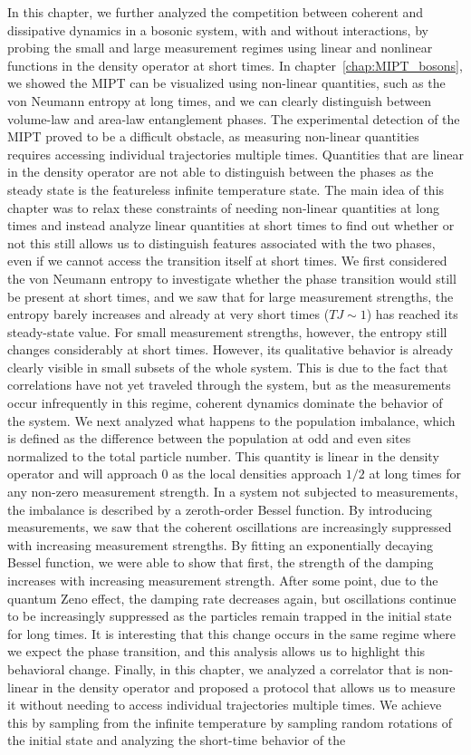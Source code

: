 In this chapter, we further analyzed the competition between coherent and dissipative dynamics in a bosonic system, with and without interactions, by probing the small and large measurement regimes using linear and nonlinear functions in the density operator at short times. In chapter~\ref{chap:MIPT_bosons}, we showed the MIPT can be visualized using non-linear quantities, such as the von Neumann entropy at long times, and we can clearly distinguish between volume-law and area-law entanglement phases. The experimental detection of the MIPT proved to be a difficult obstacle, as measuring non-linear quantities requires accessing individual trajectories multiple times. Quantities that are linear in the density operator are not able to distinguish between the phases as the steady state is the featureless infinite temperature state. The main idea of this chapter was to relax these constraints of needing non-linear quantities at long times and instead analyze linear quantities at short times to find out whether or not this still allows us to distinguish features associated with the two phases, even if we cannot access the transition itself at short times. We first considered the von Neumann entropy to investigate whether the phase transition would still be present at short times, and we saw that for large measurement strengths, the entropy barely increases and already at very short times ($TJ \sim 1$) has reached its steady-state value. For small measurement strengths, however, the entropy still changes considerably at short times. However, its qualitative behavior is already clearly visible in small subsets of the whole system. This is due to the fact that correlations have not yet traveled through the system, but as the measurements occur infrequently in this regime, coherent dynamics dominate the behavior of the system. We next analyzed what happens to the population imbalance, which is defined as the difference between the population at odd and even sites normalized to the total particle number. This quantity is linear in the density operator and will approach $0$ as the local densities approach $1/2$ at long times for any non-zero measurement strength. In a system not subjected to measurements, the imbalance is described by a zeroth-order Bessel function. By introducing measurements, we saw that the coherent oscillations are increasingly suppressed with increasing measurement strengths. By fitting an exponentially decaying Bessel function, we were able to show that first, the strength of the damping increases with increasing measurement strength. After some point, due to the quantum Zeno effect, the damping rate decreases again, but oscillations continue to be increasingly suppressed as the particles remain trapped in the initial state for long times. It is interesting that this change occurs in the same regime where we expect the phase transition, and this analysis allows us to highlight this behavioral change. Finally, in this chapter, we analyzed a correlator that is non-linear in the density operator and proposed a protocol that allows us to measure it without needing to access individual trajectories multiple times. We achieve this by sampling from the infinite temperature by sampling random rotations of the initial state and analyzing the short-time behavior of the 